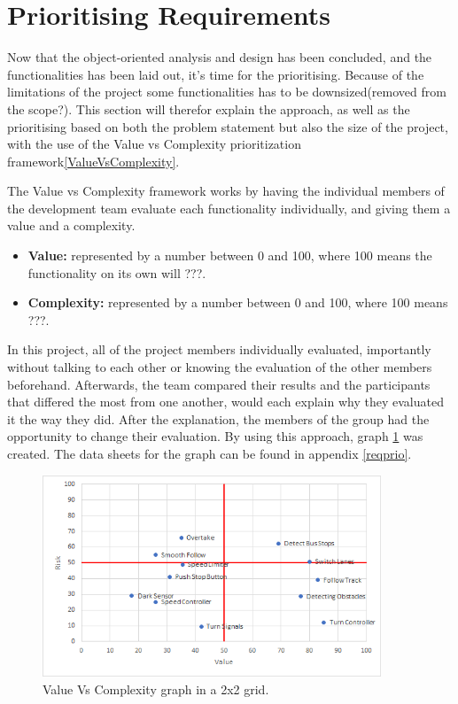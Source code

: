 \section{Prioritising Requirements}\label{section_riskVsValue}

Now that the object-oriented analysis and design has been concluded, and the functionalities has been laid out, it's time for the prioritising. Because of the limitations of the project some functionalities has to be downsized(removed from the scope?). This section will therefor explain the approach, as well as the prioritising based on both the problem statement but also the size of the project, with the use of the Value vs Complexity prioritization framework\ref{ValueVsComplexity}.

The Value vs Complexity framework works by having the individual members of the development team evaluate each functionality individually, and giving them a value and a complexity.

\begin{itemize}
  \item \textbf{Value:} represented by a number between 0 and 100, where 100 means the functionality on its own will ???.
  
  \item \textbf{Complexity:} represented by a number between 0 and 100, where 100 means ???. 
\end{itemize}

In this project, all of the project members individually evaluated, importantly without talking to each other or knowing the evaluation of the other members beforehand. Afterwards, the team compared their results and the participants that differed the most from one another, would each explain why they evaluated it the way they did. After the explanation, the members of the group had the opportunity to change their evaluation. By using this approach, graph \ref{fig:ValueVsComplexity} was created. The data sheets for the graph can be found in appendix \ref{reqprio}.

\begin{figure}[H]
    \centering
	\includegraphics[width=0.9\textwidth]{Images/Graphs/RiskValue.png}
    \caption{Value Vs Complexity graph in a 2x2 grid.}
    \label{fig:ValueVsComplexity}
\end{figure}

